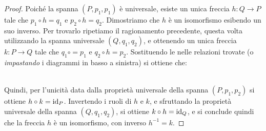 \begin{proof}
	Poiché la spanna \((P,p_1,p_1)\) è universale, esiste un unica freccia  \(h\colon Q\to P\) tale che \(p_1\circ h=q_1\) e \(p_2\circ h=q_2\). Dimostriamo che \(h\) è un isomorfismo esibendo un suo inverso. Per trovarlo ripetiamo il ragionamento precedente, questa volta utilizzando la spanna universale \((Q,q_1,q_2)\), e ottenendo un unica freccia \(k\colon P\to Q\) tale che \(q_1\circ =p_1\) e \(q_2\circ h=p_2\). Sostituendo le nelle relazioni trovate (o \emph{impastando} i diagrammi in basso a sinistra) si ottiene che:\\[2ex]
%
\hfill 
{}%
\\[2ex]
Quindi, per l'unicità data dalla proprietà universale della spanna \((P,p_1,p_2)\) si ottiene \(h\circ k=\mathrm{id}_P\). Invertendo i ruoli di \(h\) e \(k\), e sfruttando la proprietà universale della spanna \((Q,q_1,q_2)\), si ottiene \(k\circ h=\mathrm{id}_Q\), e si conclude quindi che la freccia \(h\) è un isomorfismo, con inverso \(h^{-1}=k\).
\end{proof}
